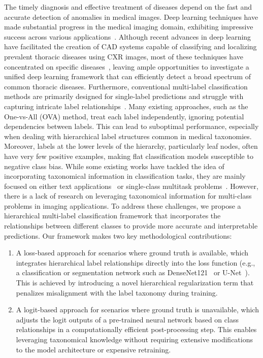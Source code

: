 \documentclass[review,1p,times,numbers]{elsarticle}
\begin{document}
The timely diagnosis and effective treatment of diseases depend on the fast and accurate detection of anomalies in medical images. Deep learning techniques have made substantial progress in the medical imaging domain, exhibiting impressive success across various applications~\cite{litjens_Survey_2017a,eshghali_Machine_2023}.  Although recent advances in deep learning have facilitated the creation of CAD systems capable of classifying and localizing prevalent thoracic diseases using CXR images, most of these techniques have concentrated on specific diseases~\cite{jaiswal_Identifying_2019,lakhani_Deep_2017,pasa_Efficient_2019,ausawalaithong_Automatic_2018}, leaving ample opportunities to investigate a unified deep learning framework that can efficiently detect a broad spectrum of common thoracic diseases.
Furthermore, conventional multi-label classification methods are primarily designed for single-label predictions and struggle with capturing intricate label relationships~\cite{tsoumakas_MultiLabel_2007}. Many existing approaches, such as the One-vs-All (OVA) method, treat each label independently, ignoring potential dependencies between labels. This can lead to suboptimal performance, especially when dealing with hierarchical label structures common in medical taxonomies. Moreover, labels at the lower levels of the hierarchy, particularly leaf nodes, often have very few positive examples, making flat classification models susceptible to negative class bias.
While some existing works have tackled the idea of incorporating taxonomical information in classification tasks, they are mainly focused on either text applications~\cite{pourvali_taxoknow_2023} or single-class multitask problems~\cite{bjerge_hierarchical_2023,ho_hierarchical_2023,ma_multitask_2021}. However, there is a lack of research on leveraging taxonomical information for multi-class problems in imaging applications.
To address these challenges, we propose a hierarchical multi-label classification framework that incorporates the relationships between different classes to provide more accurate and interpretable predictions. Our framework makes two key methodological contributions:
\begin{enumerate}
    \item A loss-based approach for scenarios where ground truth is available, which integrates hierarchical label relationships directly into the loss function (e.g., a classification or segmentation network such as DenseNet121~\cite{huang_Densely_2017} or U-Net~\cite{ronneberger_UNet_2015}). This is achieved by introducing a novel hierarchical regularization term that penalizes misalignment with the label taxonomy during training.
    \item A logit-based approach for scenarios where ground truth is unavailable, which adjusts the logit outputs of a pre-trained neural network based on class relationships in a computationally efficient post-processing step. This enables leveraging taxonomical knowledge without requiring extensive modifications to the model architecture or expensive retraining.
\end{enumerate}
\end{document}
